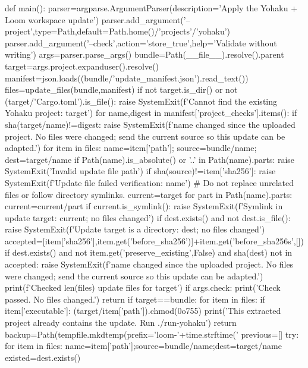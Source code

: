 def main():
    parser=argparse.ArgumentParser(description='Apply the Yohaku + Loom workspace update')
    parser.add_argument('--project',type=Path,default=Path.home()/'projects'/'yohaku')
    parser.add_argument('--check',action='store_true',help='Validate without writing')
    args=parser.parse_args()
    bundle=Path(__file__).resolve().parent
    target=args.project.expanduser().resolve()
    manifest=json.loads((bundle/'update_manifest.json').read_text())
    files=update_files(bundle,manifest)
    if not target.is_dir() or not (target/'Cargo.toml').is_file():
        raise SystemExit(f'Cannot find the existing Yohaku project: {target}')
    for name,digest in manifest['project_checks'].items():
        if sha(target/name)!=digest:
            raise SystemExit(f'{name} changed since the uploaded project. No files were changed; send the current source so this update can be adapted.')
    for item in files:
        name=item['path']; source=bundle/name; dest=target/name
        if Path(name).is_absolute() or '..' in Path(name).parts:
            raise SystemExit('Invalid update file path')
        if sha(source)!=item['sha256']:
            raise SystemExit(f'Update file failed verification: {name}')
        # Do not replace unrelated files or follow directory symlinks.
        current=target
        for part in Path(name).parts:
            current=current/part
            if current.is_symlink():
                raise SystemExit(f'Symlink in update target: {current}; no files changed')
        if dest.exists() and not dest.is_file():
            raise SystemExit(f'Update target is a directory: {dest}; no files changed')
        accepted=[item['sha256'],item.get('before_sha256')]+item.get('before_sha256s',[])
        if dest.exists() and not item.get('preserve_existing',False) and sha(dest) not in accepted:
            raise SystemExit(f'{name} changed since the uploaded project. No files were changed; send the current source so this update can be adapted.')
    print(f'Checked {len(files)} update files for {target}')
    if args.check:
        print('Check passed. No files changed.')
        return
    if target==bundle:
        for item in files:
            if item['executable']: (target/item['path']).chmod(0o755)
        print('This extracted project already contains the update. Run ./run-yohaku')
        return
    backup=Path(tempfile.mkdtemp(prefix='loom-'+time.strftime('%
    previous=[]
    try:
        for item in files:
            name=item['path'];source=bundle/name;dest=target/name
            existed=dest.exists()
